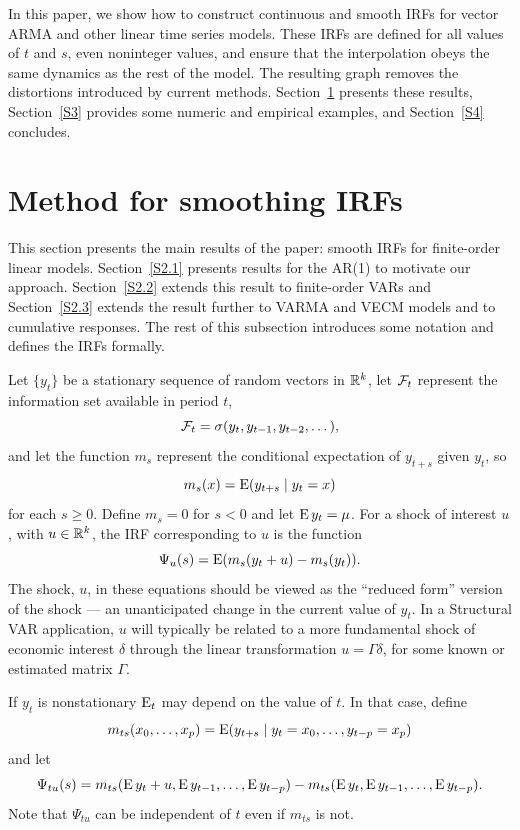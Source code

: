 \documentclass[12pt,fleqn]{article}
\begin{document}
In this paper, we show how to construct continuous and smooth IRFs
for vector ARMA and other linear time series models. These IRFs are
defined for all values of $t$ and $s$, even noninteger values, and
ensure that the interpolation obeys the same dynamics as the rest of
the model. The resulting graph removes the distortions introduced by
current methods.  Section~\ref{S2} presents these results,
Section~\ref{S3} provides some numeric and empirical examples, and
Section~\ref{S4} concludes.

\section{Method for smoothing IRFs}
\label{S2}

This section presents the main results of the paper: smooth IRFs for
finite-order linear models. Section~\ref{S2.1} presents results for
the AR(1) to motivate our approach. Section~\ref{S2.2} extends this
result to finite-order VARs and Section~\ref{S2.3} extends the
result further to VARMA and VECM models and to cumulative responses.
The rest of this subsection introduces some notation and defines the
IRFs formally.

Let $\{y_t\}$ be a stationary sequence of random vectors in $\mathbb{R}^k$,
let $\mathcal{F}_t$ represent the information set available in period $t$,
\begin{equation*}
  \mathcal{F}_t = \sigma(y_t, y_{t-1}, y_{t-2},\dots),
\end{equation*}
and let the function $m_s$ represent the conditional expectation of
$y_{t+s}$ given $y_t$, so
\begin{equation*}
  m_s(x) = \operatorname{E}(y_{t+s} \mid y_t = x)
\end{equation*}
for each $s \geq 0$. Define $m_s = 0$ for $s < 0$ and let
$\operatorname{E} y_t = \mu$. For a shock of interest $u$, with $u \in \mathbb{R}^k$, the
IRF corresponding to $u$ is the function
\begin{equation}
  \label{eq:16}
  \Psi_{u}(s) = \operatorname{E}(m_s(y_t + u) - m_s(y_t)).
\end{equation}
The shock, $u$, in these equations should be viewed as the ``reduced
form'' version of the shock --- an unanticipated change in the current
value of $y_t$. In a Structural VAR application, $u$ will typically
be related to a more fundamental shock of economic interest $\delta$
through the linear transformation $u = \Gamma \delta$, for some known
or estimated matrix $\Gamma$.

If $y_t$ is nonstationary $\operatorname{E}_t$ may depend on the value of $t$. In that
case, define
\begin{equation*}
  m_{ts}(x_0,\dots,x_p)
  = \operatorname{E}(y_{t+s} \mid y_t = x_0,\dots, y_{t-p} = x_p)
\end{equation*}
and let
\begin{equation*}
  \Psi_{tu}(s) =
  m_{ts}(\operatorname{E} y_t + u, \operatorname{E} y_{t-1}, \dots, \operatorname{E} y_{t-p}) - m_{ts}(\operatorname{E} y_t, \operatorname{E} y_{t-1}, \dots,\operatorname{E} y_{t-p}).
\end{equation*}
Note that $\Psi_{tu}$ can be independent of $t$ even if $m_{ts}$ is
not.
\end{document}
